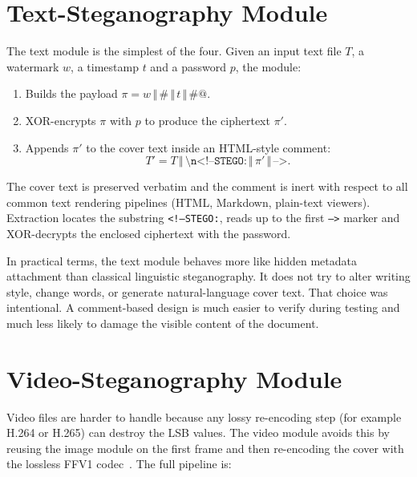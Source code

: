 \section{Text-Steganography Module}
\label{sec:text_module}

The text module is the simplest of the four. Given an input text file $T$, a watermark $w$, a timestamp $t$ and a password $p$, the module:

\begin{enumerate}[label=(\arabic*)]
    \item Builds the payload $\pi = w \,\Vert\, \texttt{\#} \,\Vert\, t \,\Vert\, \texttt{\#@}$.
    \item XOR-encrypts $\pi$ with $p$ to produce the ciphertext $\pi'$.
    \item Appends $\pi'$ to the cover text inside an HTML-style comment:
    \[
        T' = T \,\Vert\, \texttt{\textbackslash n<!--STEGO:} \,\Vert\, \pi' \,\Vert\, \texttt{-->}.
    \]
\end{enumerate}

The cover text is preserved verbatim and the comment is inert with respect to all common text rendering pipelines (HTML, Markdown, plain-text viewers). Extraction locates the substring \texttt{<!--STEGO:}, reads up to the first \texttt{-->} marker and XOR-decrypts the enclosed ciphertext with the password.

In practical terms, the text module behaves more like hidden metadata attachment than classical linguistic steganography. It does not try to alter writing style, change words, or generate natural-language cover text. That choice was intentional. A comment-based design is much easier to verify during testing and much less likely to damage the visible content of the document.

\section{Video-Steganography Module}
\label{sec:video_module}

Video files are harder to handle because any lossy re-encoding step (for example H.264 or H.265) can destroy the LSB values. The video module avoids this by reusing the image module on the first frame and then re-encoding the cover with the lossless FFV1 codec~\cite{niedermayer2013ffv1}. The full pipeline is:

